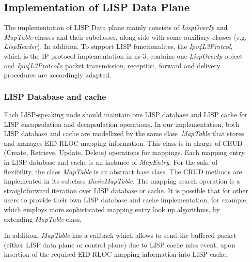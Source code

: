 \subsection{Implementation of LISP Data Plane}
\label{subsec:modifyInternet}
The implementation of LISP Data plane mainly consists of \emph{LispOverIp} and \emph{MapTable} classes and their subclasses, along side with some auxiliary classes (e.g. \emph{LispHeader}). In addition, To support LISP functionalites, the \emph{Ipv4L3Protcol}, which is the IP protocol implementation in ns-3, contains one \emph{LispOverIp} object and \emph{Ipv4L3Protcol}'s packet transmission, reception, forward and delivery procedures are accordingly adapted.
\subsubsection{LISP Database and cache}
\label{subsec:database-impl}
Each LISP-speaking node should maintain one LISP database and LISP cache for LISP encapsulation and decapsulation operations. In our implementation, both LISP database and cache are modellized by the same class~\emph{MapTable} that stores and manages EID-RLOC mapping information. This class is in charge of CRUD (Create, Retrieve, Update, Delete) operations for mappings. Each mapping entry in LISP database and cache is an instance of \emph{MapEntry}. For the sake of flexibility, the class \emph{MapTable} is an abstract base class. The CRUD methods are implemented in its subclass \emph{BasicMapTable}. The mapping search operation is a straightforward iteration over LISP database or cache. It is possible that for other users to provide their own LISP database and cache implementation, for example, which employs more sophisticated mapping entry look up algorithms, by extending \emph{MapTable} class.

In addition, \emph{MapTable} has a callback which allows to send the buffered packet (either LISP data plane or control plane) due to LISP cache miss event, upon insertion of the required EID-RLOC mapping information into LISP cache.


